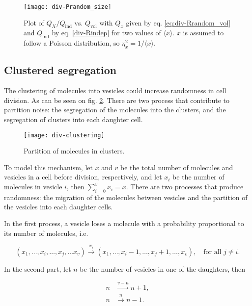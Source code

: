 \begin{figure}[H]
  \centering
  \texttt{[image: div-Prandom\_size]}
  \caption[Partition noise when the sizes of the daughter cells are random]{\label{fig:div-Prandom_size}Plot of $Q_X/Q_\text{ind}$ vs. $Q_\text{vol}$ with $Q_x$ given by eq. \eqref{eq:div-Rrandom_vol} and $Q_\text{ind}$ by eq. \eqref{div-Rindep} for two values of $\langle x\rangle$. $x$ is assumed to follow a Poisson distribution, so $\eta_x^2=1/\langle x\rangle$.}
\end{figure}

\subsection{Clustered segregation}

The clustering of molecules into vesicles could increase randomness in cell division. As can be seen on fig. \ref{fig:div-clustering}. There are two process that contribute to partition noise: the segregation of the molecules into the clusters, and the segregation of clusters into each daughter cell.

\begin{figure}[H]
  \centering
  \texttt{[image: div-clustering]}
  \caption[Partition of molecules in clusters]{\label{fig:div-clustering} Partition of molecules in clusters.}
\end{figure}

To model this mechanism, let $x$ and $v$ be the total number of molecules and vesicles in a cell before division, respectively, and let $x_i$ be the number of molecules in vesicle $i$, then $\sum_{i=0}^vx_i=x$. There are two processes that produce randomness: the migration of the molecules between vesicles and the partition of the vesicles into each daughter cells.

In the first process, a vesicle loses a molecule with a probability proportional to its number of molecules, i.e.

\begin{equation}
  \label{eq:div-vesicle_switch}
  (x_1,\dotsc,x_i,\dotsc,x_j,\dotsc x_v) \xrightarrow{x_i} (x_1,\dotsc,x_i-1,\dotsc,x_j+1,\dotsc, x_v),\quad \text{for all } j\neq i.
\end{equation}

In the second part, let $n$ be the number of vesicles in one of the daughters, then

\begin{equation}
  \label{eq:div-arr_clust}
  \begin{split}
    n &\xrightarrow{v-n} n+1,\\
    n &\xrightarrow{n} n-1.
  \end{split}
\end{equation}

